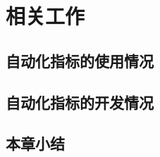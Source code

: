 
\chapter{相关工作}\label{ch:相关工作}
\section{自动化指标的使用情况}

\section{自动化指标的开发情况}

\section{本章小结}\label{sec:本章小结}

